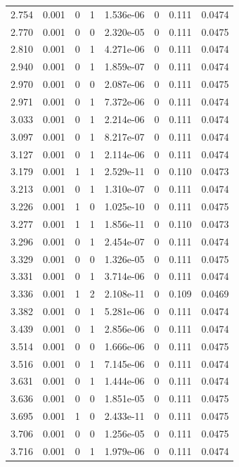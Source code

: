 \documentclass[preview]{standalone}
\begin{document}
{{{\begin{tabular}{L{1.2cm}C{1.2cm} C{0.3cm}C{0.5cm} C{1.4cm}C{1.4cm} C{1.4cm}C{1.4cm}}
  2.754  &  0.001  & 0     &  1 &  1.536e-06  & 0  & 0.111 &  0.0474   \\ 
  2.770  &  0.001  & 0     &  0 &  2.320e-05  & 0  & 0.111 &  0.0475   \\ 
  2.810  &  0.001  & 0     &  1 &  4.271e-06  & 0  & 0.111 &  0.0474   \\ 
  2.940  &  0.001  & 0     &  1 &  1.859e-07  & 0  & 0.111 &  0.0474   \\ 
  2.970  &  0.001  & 0     &  0 &  2.087e-06  & 0  & 0.111 &  0.0475   \\ 
  2.971  &  0.001  & 0     &  1 &  7.372e-06  & 0  & 0.111 &  0.0474   \\ 
  3.033  &  0.001  & 0     &  1 &  2.214e-06  & 0  & 0.111 &  0.0474   \\ 
  3.097  &  0.001  & 0     &  1 &  8.217e-07  & 0  & 0.111 &  0.0474   \\ 
  3.127  &  0.001  & 0     &  1 &  2.114e-06  & 0  & 0.111 &  0.0474   \\ 
  3.179  &  0.001  & 1     &  1 &  2.529e-11  & 0  & 0.110 &  0.0473   \\ 
  3.213  &  0.001  & 0     &  1 &  1.310e-07  & 0  & 0.111 &  0.0474   \\ 
  3.226  &  0.001  & 1     &  0 &  1.025e-10  & 0  & 0.111 &  0.0475   \\ 
  3.277  &  0.001  & 1     &  1 &  1.856e-11  & 0  & 0.110 &  0.0473   \\ 
  3.296  &  0.001  & 0     &  1 &  2.454e-07  & 0  & 0.111 &  0.0474   \\ 
  3.329  &  0.001  & 0     &  0 &  1.326e-05  & 0  & 0.111 &  0.0475   \\ 
  3.331  &  0.001  & 0     &  1 &  3.714e-06  & 0  & 0.111 &  0.0474   \\ 
  3.336  &  0.001  & 1     &  2 &  2.108e-11  & 0  & 0.109 &  0.0469   \\ 
  3.382  &  0.001  & 0     &  1 &  5.281e-06  & 0  & 0.111 &  0.0474   \\ 
  3.439  &  0.001  & 0     &  1 &  2.856e-06  & 0  & 0.111 &  0.0474   \\ 
  3.514  &  0.001  & 0     &  0 &  1.666e-06  & 0  & 0.111 &  0.0475   \\ 
  3.516  &  0.001  & 0     &  1 &  7.145e-06  & 0  & 0.111 &  0.0474   \\ 
  3.631  &  0.001  & 0     &  1 &  1.444e-06  & 0  & 0.111 &  0.0474   \\ 
  3.636  &  0.001  & 0     &  0 &  1.851e-05  & 0  & 0.111 &  0.0475   \\ 
  3.695  &  0.001  & 1     &  0 &  2.433e-11  & 0  & 0.111 &  0.0475   \\ 
  3.706  &  0.001  & 0     &  0 &  1.256e-05  & 0  & 0.111 &  0.0475   \\ 
  3.716  &  0.001  & 0     &  1 &  1.979e-06  & 0  & 0.111 &  0.0474   \\ 
\hline 
\end{tabular} 

}}}
\end{document}
